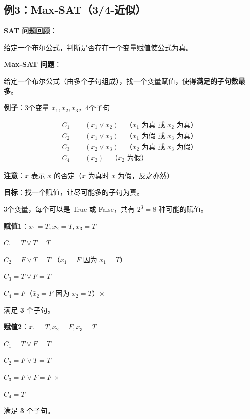 \documentclass[12pt, a4paper]{ctexart}
\begin{document}
\subsection{例3：Max-SAT（3/4-近似）}

\begin{blackboard}

\textbf{SAT 问题回顾}：

给定一个布尔公式，判断是否存在一个变量赋值使公式为真。

\textbf{Max-SAT 问题}：

给定一个布尔公式（由多个子句组成），找一个变量赋值，使得\textbf{满足的子句数最多}。

\textbf{例子}：3个变量 $x_1, x_2, x_3$，4个子句

\begin{align*}
C_1 &= (x_1 \vee x_2) \quad \text{（$x_1$ 为真 或 $x_2$ 为真）} \\
C_2 &= (\bar{x}_1 \vee x_3) \quad \text{（$x_1$ 为假 或 $x_3$ 为真）} \\
C_3 &= (x_2 \vee \bar{x}_3) \quad \text{（$x_2$ 为真 或 $x_3$ 为假）} \\
C_4 &= (\bar{x}_2) \quad \text{（$x_2$ 为假）}
\end{align*}

\textbf{注意}：$\bar{x}$ 表示 $x$ 的否定（$x$ 为真时 $\bar{x}$ 为假，反之亦然）

\textbf{目标}：找一个赋值，让尽可能多的子句为真。

\end{blackboard}

\begin{blackboard}[枚举所有可能的赋值]

3个变量，每个可以是 True 或 False，共有 $2^3 = 8$ 种可能的赋值。

\textbf{赋值1}：$x_1 = T, x_2 = T, x_3 = T$

$C_1 = T \vee T = T$ \checkmark

$C_2 = F \vee T = T$ \checkmark（$\bar{x}_1 = F$ 因为 $x_1 = T$）

$C_3 = T \vee F = T$ \checkmark

$C_4 = F$（$\bar{x}_2 = F$ 因为 $x_2 = T$）$\times$

满足 \textbf{3} 个子句。

\textbf{赋值2}：$x_1 = T, x_2 = F, x_3 = T$

$C_1 = T \vee F = T$ \checkmark

$C_2 = F \vee T = T$ \checkmark

$C_3 = F \vee F = F$ $\times$

$C_4 = T$ \checkmark

满足 \textbf{3} 个子句。

\end{blackboard}
\end{document}
